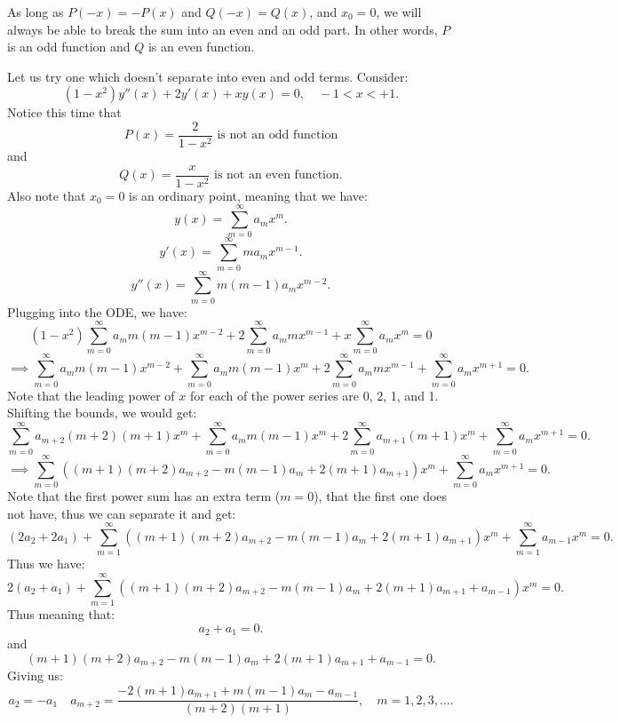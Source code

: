 \documentclass[../main/main.tex]{subfiles}
\begin{document}
\begin{remark}
	As long as $P(-x)=-P(x)$ and $Q(-x)=Q(x)$, and $x_0=0$, we will always be able to break the sum into an even and an odd part. In other words, $P$ is an odd function and  $Q$ is an even function.
\end{remark}
Let us try one which doesn't separate into even and odd terms. Consider: \[
	(1-x^2) y''(x) + 2y'(x) + xy(x) = 0, \quad -1<x<+1
.\] Notice this time that  \[
P(x) = \frac{2}{1-x^2}\text{ is not an odd function}
\] and \[
Q(x) = \frac{x}{1-x^2}\text{ is not an even function}
.\] Also note that $x_0=0$ is an ordinary point, meaning that we have: \[
y(x) = \sum_{m=0}^{\infty} a_m x^{m}
.\] \[
y'(x) = \sum_{m=0}^{\infty} ma_m x^{m-1}
.\]\[
y''(x) = \sum_{m=0}^{\infty} m(m-1)a_{m} x^{m-2}
.\]  Plugging into the ODE, we have: \[
(1-x^2)\sum_{m=0}^{\infty} a_{m}m(m-1)x^{m-2}+2 \sum_{m=0}^{\infty} a_m m x^{m-1}+ x \sum_{m=0}^{\infty} a_m x^{m}=0
\] \[
\implies 
\sum_{m=0}^{\infty} a_{m}m(m-1)x^{m-2}+\sum_{m=0}^{\infty} a_{m}m(m-1)x^{m}+2 \sum_{m=0}^{\infty} a_m m x^{m-1}+  \sum_{m=0}^{\infty} a_m x^{m+1}=0
.\] Note that the leading power of $x$ for each of the power series are 0, 2, 1, and 1. Shifting the bounds, we would get: \[ 
\sum_{m=0}^{\infty} a_{m+2}(m+2)(m+1)x^{m}+\sum_{m=0}^{\infty} a_{m}m(m-1)x^{m}+2 \sum_{m=0}^{\infty} a_{m+1} (m+1) x^{m}+  \sum_{m=0}^{\infty} a_m x^{m+1}=0
.\] \[
\implies \sum_{m=0}^{\infty} \left( (m+1)(m+2) a_{m+2}-m(m-1)a_m+2(m+1)a_{m+1} \right) x^{m}+\sum_{m=0}^{\infty} a_mx^{m+1}=0
.\] Note that the first power sum has an extra term ($m=0$), that the first one does not have, thus we can separate it and get: \[
(2a_2+2a_1)+\sum_{m=1}^{\infty} \left( (m+1)(m+2) a_{m+2}-m(m-1)a_m+2(m+1)a_{m+1} \right) x^{m}+\sum_{m=1}^{\infty} a_{m-1}x^{m}=0
.\] Thus we have: \[
2(a_2+a_1)+\sum_{m=1}^{\infty} \left( (m+1)(m+2) a_{m+2}-m(m-1)a_m+2(m+1)a_{m+1}+a_{m-1} \right) x^{m}=0 
.\] Thus meaning that: \[
a_2 + a_1 = 0
.\] and \[
(m+1)(m+2) a_{m+2}-m(m-1)a_m+2(m+1)a_{m+1}+a_{m-1} =0 
.\] Giving us: \[
a_2 = -a_1\quad a_{m+2} = \frac{-2(m+1)a_{m+1}+m(m-1)a_m-a_{m-1}}{(m+2)(m+1)},\quad m=1,2,3,\ldots
.\] 
\end{document}
